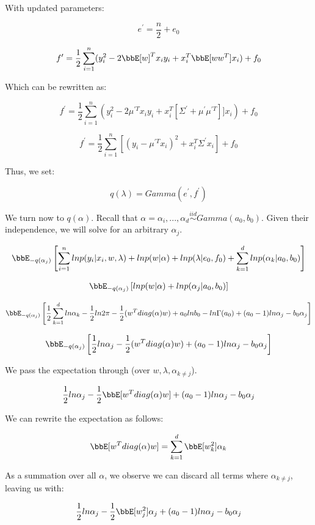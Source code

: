 \documentclass[twoside,11pt]{homework}
\begin{document}
With updated parameters:

\[
e^\prime = \frac{n}{2} + e_0
\]

\[
f^\prime = \frac{1}{2} \sum_{i=1}^n(y_i^2 - 2\bbE[w]^Tx_iy_i + x_i^T\bbE[ww^T]x_i) + f_0
\]

Which can be rewritten as:

\[
f^\prime = \frac{1}{2} \sum_{i=1}^n(y_i^2 - 2\mu^{\prime T} x_iy_i + x_i^T[ \Sigma^\prime + \mu^\prime \mu^{\prime T}]]x_i) + f_0
\]

\[
f^\prime = \frac{1}{2} \sum_{i=1}^n [(y_i - \mu^{\prime T}x_i)^2 + x_i^T\Sigma^\prime x_i] + f_0
\]

Thus, we set:

\begin{equation}
q(\lambda) = Gamma(e^\prime, f^\prime)
\end{equation}


We turn now to $q(\alpha)$. Recall that $\alpha = \alpha_i, ..., \alpha_d \stackrel{iid}{\sim} Gamma(a_0, b_0)$. Given their independence, we will solve for an arbitrary $\alpha_j$.

\[
\bbE_{-q(\alpha_j)} \Brackets{
 \sum_{i=1}^n  ln p(y_i | x_i, w, \lambda) + ln p(w | \alpha)
+ ln p(\lambda | e_0, f_0) + \sum_{k=1}^d ln p(\alpha_k | a_0, b_0)
}
\]

\[
\bbE_{-q(\alpha_j)} \Brackets{
ln p(w | \alpha)
+ ln p(\alpha_j | a_0, b_0)
}
\]

\[
\bbE_{-q(\alpha_j)} \Brackets{
 \frac{1}{2}\sum_{k=1}^dln\alpha_k - \frac{1}{2}ln2\pi - \frac{1}{2}(w^Tdiag(\alpha)w)
+ a_0lnb_0 - ln\Gamma(a_0) + (a_0 - 1)ln\alpha_j - b_0\alpha_j
}
\]

\[
\bbE_{-q(\alpha_j)} \Brackets{
 \frac{1}{2}ln\alpha_j - \frac{1}{2}(w^Tdiag(\alpha)w)
+ (a_0 - 1)ln\alpha_j - b_0\alpha_j
}
\]

We pass the expectation through (over $w, \lambda, \alpha_{k \neq j}$).

\[
 \frac{1}{2}ln\alpha_j - \frac{1}{2}\bbE[w^Tdiag(\alpha)w]
+ (a_0 - 1)ln\alpha_j - b_0\alpha_j
\]

We can rewrite the expectation as follows:

\[
\bbE[w^Tdiag(\alpha)w] =
\sum_{k=1}^d \bbE[w_k^2] \alpha_k
\]

As a summation over all $\alpha$, we observe we can discard all terms where $\alpha_{k \neq j}$, leaving us with:

\[
 \frac{1}{2}ln\alpha_j - \frac{1}{2}\bbE[w_j^2] \alpha_j
+ (a_0 - 1)ln\alpha_j - b_0\alpha_j
\]
\end{document}
